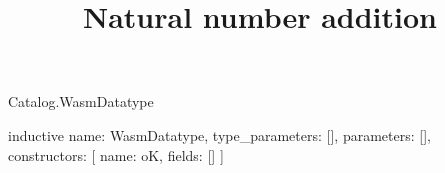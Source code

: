 \begin{lexlean}{Catalog.WasmDatatype}
\title{Natural number addition}
\begin{semanticmodule}
inductive{
  name: WasmDatatype,
  type_parameters: [],
  parameters: [],
  constructors: [
    {name: oK, fields: []}
  ]
}
\end{semanticmodule}
\end{lexlean}
